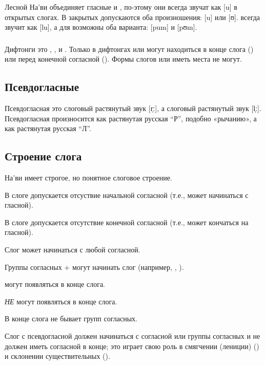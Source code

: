 \subsubsection{} Лесной На'ви объединяет гласные  и , 
по-этому они всегда звучат как [u] в открытых слогах. В закрытых допускаются оба произношения: [u]
или [ʊ].   всегда звучит как [lu],
а для  возможны оба варианта: [pum] и [pʊm].


\subsubsection{} Дифтонги это , ,  и .
Только в дифтонгах  или  могут находиться в конце слога () или перед конечной согласной ().  Формы слогов  или  иметь места не могут.

\subsection{Псевдогласные} Псевдогласная  это слоговый растянутый звук [r̩ː], а  слоговый растянутый звук [l̩ː]. Псевдогласная  произносится как растянутая русская ``Р'', подобно «рычанию», а  как растянутая русская ``Л''.

\subsection{Строение слога}
 На'ви имеет строгое, но понятное слоговое строение.

\begin{itemize*}
  \item В слоге допускается отсуствие начальной согласной (т.е., может начинаться с гласной).
  \item В слоге допускается отсутствие конечной согласной (т.е., может кончаться на гласной).
  \item Слог может начинаться с любой согласной.
  \item Группы согласных  $+$  могут начинать слог (например, , ).
  \item {} могут появляться в конце слога.
  \item {}  \textit{НЕ} могут появляться в конце слога.
  \item В конце слога не бывает групп согласных.
  \item \label{l-and-s:pseudo-no-null} Слог с псевдогласной должен начинаться с согласной или группы согласных и не должен иметь согласной в конце; это играет свою роль в смягчении (лениции)
    () и склонении существительных
    ().
\end{itemize*}


